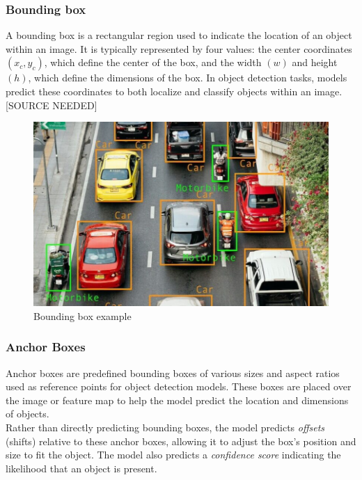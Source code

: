 \subsubsection*{Bounding box}
A bounding box is a rectangular region used to indicate the location of an object within an image. It is typically represented by four values: the center coordinates \((x_c, y_c)\), which define the center of the box, and the width \((w)\) and height \((h)\), which define the dimensions of the box. In object detection tasks, models predict these coordinates to both localize and classify objects within an image. [SOURCE NEEDED]

\begin{figure}[h!]
    \centering
    \includegraphics[width=0.9\linewidth]{figures/theory/bbox-example.png}
    \caption[Bounding box example]{Bounding box example \cite{peopleforai:boundingbox}}
    \label{fig:classification}
\end{figure}

\subsubsection*{Anchor Boxes}
Anchor boxes are predefined bounding boxes of various sizes and aspect ratios used as reference points for object detection models. These boxes are placed over the image or feature map to help the model predict the location and dimensions of objects. \\

Rather than directly predicting bounding boxes, the model predicts \textit{offsets} (shifts) relative to these anchor boxes, allowing it to adjust the box's position and size to fit the object. The model also predicts a \textit{confidence score} indicating the likelihood that an object is present. \\

